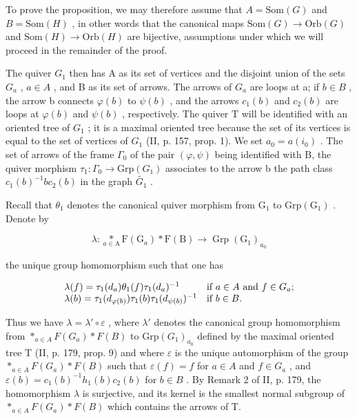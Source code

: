 To prove the proposition, we may therefore assume that \(A = \text{Som}(G)\) and \(B = \text{Som}(H)\) , in other words that the canonical maps \(\text{Som}(G) \to \text{Orb}(G)\) and \(\text{Som}(H) \to \text{Orb}(H)\) are bijective, assumptions under which we will proceed in the remainder of the proof.

The quiver \(G_{1}\) then has A as its set of vertices and the disjoint union of the sets \(G_{a}\) , \(a \in A\) , and B as its set of arrows. The arrows of \(G_{a}\) are loops at a; if \(b \in B\) , the arrow b connects \(\varphi(b)\) to \(\psi(b)\) , and the arrows \(c_{1}(b)\) and \(c_{2}(b)\) are loops at \(\varphi(b)\) and \(\psi(b)\) , respectively. The quiver T will be identified with an oriented tree of \(G_{1}\) ; it is a maximal oriented tree because the set of its vertices is equal to the set of vertices of \(G_{1}\) (II, p. 157, prop. 1). We set \(a_{0} = a(i_{0})\) . The set of arrows of the frame \(\Gamma_{0}\) of the pair \((\varphi, \psi)\) being identified with B, the quiver morphism \(\tau_{1}: \Gamma_{0} \to \text{Grp}(G_{1})\) associates to the arrow b the path class \(c_{1}(b)^{-1}bc_{2}(b)\) in the graph \(\widetilde{G_{1}}\) .

Recall that \(\theta_{1}\) denotes the canonical quiver morphism from \(\mathrm{G}_{1}\) to \(\mathrm{Grp}(\mathrm{G}_{1})\) . Denote by

\[
\lambda \colon \underset {a \in \mathrm{A}} {*} \mathrm{F} (\mathrm{G} _ {a}) * \mathrm{F} (\mathrm{B}) \to \operatorname{Grp} (\mathrm{G} _ {1}) _ {a _ {0}}
\]

the unique group homomorphism such that one has

\[
\begin{array}{l l} \lambda (f) = \tau_ {1} (d _ {a}) \theta_ {1} (f) \tau_ {1} (d _ {a}) ^ {- 1} & \text {if } a\in A \text{ and } f\in G_{a} \text{;} \\ \lambda (b) = \tau_ {1} (d _ {\varphi (b)}) \tau_ {1} (b) \tau_ {1} (d _ {\psi (b)}) ^ {- 1} & \text {if } b\in B \text{.} \end{array}
\]

Thus we have \(\lambda = \lambda' \circ \varepsilon\) , where \(\lambda'\) denotes the canonical group homomorphism from \(*_{a \in A} F(G_a) * F(B)\) to \(\text{Grp}(G_1)_{a_0}\) defined by the maximal oriented tree T (II, p. 179, prop. 9) and where \(\varepsilon\) is the unique automorphism of the group \(*_{a \in A} F(G_a) * F(B)\) such that \(\varepsilon(f) = f\) for \(a \in A\) and \(f \in G_a\) , and \(\varepsilon(b) = c_1(b)^{-1} h_1(b)c_2(b)\) for \(b \in B\) . By Remark 2 of II, p. 179, the homomorphism \(\lambda\) is surjective, and its kernel is the smallest normal subgroup of \(*_{a \in A} F(G_a) * F(B)\) which contains the arrows of T.

